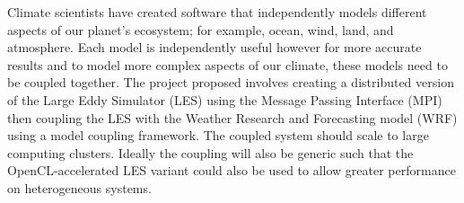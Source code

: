 Climate scientists have created software that independently models different
aspects of our planet's ecosystem; for example, ocean, wind, land, and
atmosphere. Each model is independently useful however for more accurate results
and to model more complex aspects of our climate, these models need to be
coupled together. The project proposed involves creating a distributed version
of the Large Eddy Simulator (LES) using the Message Passing Interface (MPI) then
coupling the LES with the Weather Research and Forecasting model (WRF) using a
model coupling framework. The coupled system should scale to large computing
clusters. Ideally the coupling will also be generic such that the
OpenCL-accelerated LES variant could also be used to allow greater performance
on heterogeneous systems.
